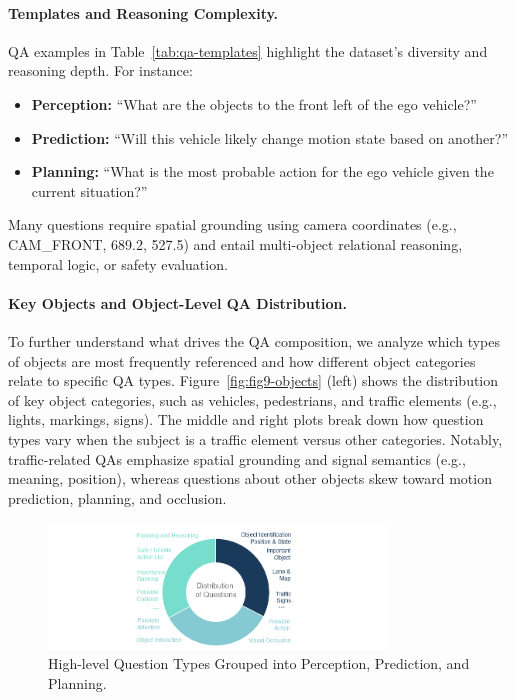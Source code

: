 \documentclass{article} %
\begin{document}
\paragraph{Templates and Reasoning Complexity.}
QA examples in Table~\ref{tab:qa-templates} highlight the dataset’s diversity and reasoning depth. For instance:
\begin{itemize}
    \item \textbf{Perception:} “What are the objects to the front left of the ego vehicle?”
    \item \textbf{Prediction:} “Will this vehicle likely change motion state based on another?”
    \item \textbf{Planning:} “What is the most probable action for the ego vehicle given the current situation?”
\end{itemize}
Many questions require spatial grounding using camera coordinates (e.g., CAM\_FRONT, 689.2, 527.5) and entail multi-object relational reasoning, temporal logic, or safety evaluation.

\paragraph{Key Objects and Object-Level QA Distribution.}
To further understand what drives the QA composition, we analyze which types of objects are most frequently referenced and how different object categories relate to specific QA types. Figure~\ref{fig:fig9-objects} (left) shows the distribution of key object categories, such as vehicles, pedestrians, and traffic elements (e.g., lights, markings, signs). The middle and right plots break down how question types vary when the subject is a traffic element versus other categories. Notably, traffic-related QAs emphasize spatial grounding and signal semantics (e.g., meaning, position), whereas questions about other objects skew toward motion prediction, planning, and occlusion.

\begin{figure}[H]
    \centering
    \includegraphics[width=0.8\textwidth]{Figures/DriveLM_Dataset_Fig7.png}
    \caption{High-level Question Types Grouped into Perception, Prediction, and Planning.}
    \label{fig:question-distribution}
\end{figure}
\end{document}

